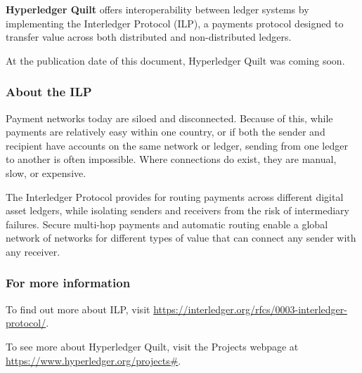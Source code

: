 \textbf{Hyperledger Quilt} offers interoperability between ledger systems by implementing the Interledger Protocol (ILP), a payments protocol designed to transfer value across both distributed and non-distributed ledgers. 

At the publication date of this document, Hyperledger Quilt was coming soon. 

\subsubsection{About the ILP}
Payment networks today are siloed and disconnected. 
Because of this, while payments are relatively easy within one country, or if both the sender and recipient have accounts on the same network or ledger, sending from one ledger to another is often impossible. 
Where connections do exist, they are manual, slow, or expensive.

The Interledger Protocol provides for routing payments across different digital asset ledgers, while isolating senders and receivers from the risk of intermediary failures. Secure multi-hop payments and automatic routing enable a global network of networks for different types of value that can connect any sender with any receiver.

\subsubsection{For more information}
To find out more about ILP, visit \url{https://interledger.org/rfcs/0003-interledger-protocol/}.

To see more about Hyperledger Quilt, visit the Projects webpage at \url{https://www.hyperledger.org/projects#}.







